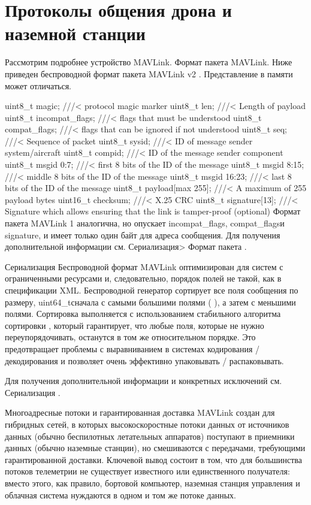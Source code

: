 
\section{Протоколы общения дрона и наземной станции}
Рассмотрим подробнее устройство MAVLink.
Формат пакета MAVLink.
Ниже приведен беспроводной формат пакета MAVLink v2 . Представление в памяти может отличаться.

uint8\_t magic;              ///< protocol magic marker
uint8\_t len;                ///< Length of payload
uint8\_t incompat\_flags;     ///< flags that must be understood
uint8\_t compat\_flags;       ///< flags that can be ignored if not understood
uint8\_t seq;                ///< Sequence of packet
uint8\_t sysid;              ///< ID of message sender system/aircraft
uint8\_t compid;             ///< ID of the message sender component
uint8\_t msgid 0:7;          ///< first 8 bits of the ID of the message
uint8\_t msgid 8:15;         ///< middle 8 bits of the ID of the message
uint8\_t msgid 16:23;        ///< last 8 bits of the ID of the message
uint8\_t payload[max 255];   ///< A maximum of 255 payload bytes
uint16\_t checksum;          ///< X.25 CRC
uint8\_t signature[13];      ///< Signature which allows ensuring that the link is tamper-proof (optional)
Формат пакета MAVLink 1 аналогична, но опускает incompat\_flags, compat\_flagsи signature, и имеет только один байт для адреса сообщения. Для получения дополнительной информации см. Сериализация> Формат пакета .

Сериализация
Беспроводной формат MAVLink оптимизирован для систем с ограниченными ресурсами и, следовательно, порядок полей не такой, как в спецификации XML. Беспроводной генератор сортирует все поля сообщения по размеру, uint64\_tсначала с самыми большими полями ( ), а затем с меньшими полями. Сортировка выполняется с использованием стабильного алгоритма сортировки , который гарантирует, что любые поля, которые не нужно переупорядочивать, останутся в том же относительном порядке. Это предотвращает проблемы с выравниванием в системах кодирования / декодирования и позволяет очень эффективно упаковывать / распаковывать.

Для получения дополнительной информации и конкретных исключений см. Сериализация .

Многоадресные потоки и гарантированная доставка
MAVLink создан для гибридных сетей, в которых высокоскоростные потоки данных от источников данных (обычно беспилотных летательных аппаратов) поступают в приемники данных (обычно наземные станции), но смешиваются с передачами, требующими гарантированной доставки. Ключевой вывод состоит в том, что для большинства потоков телеметрии не существует известного или единственного получателя: вместо этого, как правило, бортовой компьютер, наземная станция управления и облачная система нуждаются в одном и том же потоке данных.

